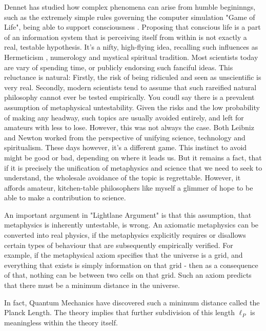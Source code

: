 \documentclass[notitlepage]{article}
\begin{document}
Dennet \cite{Dennet_1991} has studied how complex phenomena can arise from humble begininngs, such as the extremely simple rules governing the computer simulation "Game of Life", being able to support consciousness \cite{gameOfLife_wiki}. Proposing that conscious life is a part of an information system that is perceiving itself from within is not exactly a real, testable hypothesis. It's a nifty, high-flying idea, recalling such influences as Hermeticism \cite{Kybalion_1908}, numerology and mystical spiritual tradition. Most scientists today are vary of spending time, or publicly endorsing such fanciful ideas.
This reluctance is natural: Firstly, the risk of being ridiculed and seen as unscientific is very real. Secondly, modern scientists tend to  assume that such rareified natural philosophy cannot ever be tested empirically. You coudl say there is a prevalent assumption of metaphysical untestability. Given the risks and the low probability of making any headway, such topics are usually avoided entirely, and left for amateurs with less to lose. However, this was not always the case. Both Leibniz and Newton worked from the perspective of unifying science, technology and spiritualism. These days however, it's a different game. This instinct to avoid might be good or bad, depending on where it leads us. But it remains a fact, that if it is precisely the unification of metaphysics and science that we need to seek to understand, the wholesale avoidance of the topic is regrettable. However, it affords amateur, kitchen-table philosophers like myself a glimmer of hope to be able to make a contribution to science.

An important argument in "Lightlane Argument" \cite{RhadamantysA1} is that this assumption, that metaphysics is inherently untestable, is wrong. An axiomatic metaphysics can be converted into real physics, if the metaphysics explicitly requires or disallows certain types of behaviour that are subsequently empirically verified. For example, if the metaphysical axiom specifies that the universe is a grid, and everything that exists is simply information on that grid - then as a consequence of that, nothing can be between two cells on that grid. Such an axiom predicts that there must be a minimum distance in the universe. 

In fact, Quantum Mechanics have discovered such a minimum distance called the Planck Length.  The theory implies that further subdivision of this length $ \ell_P $ is meaningless within the theory itself. 
\end{document}
